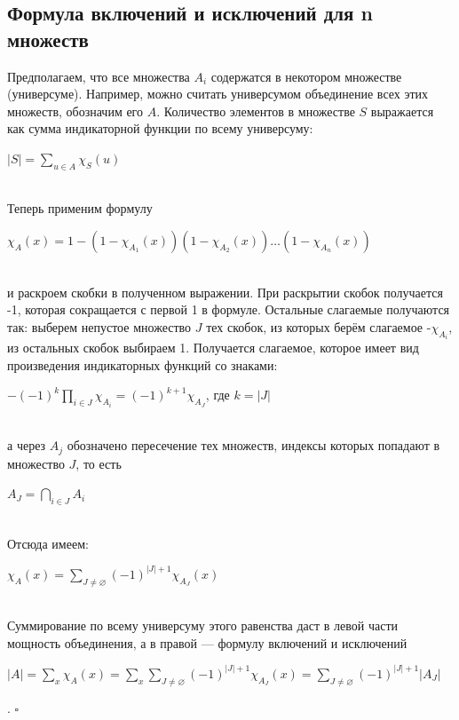 \documentclass[a4paper]{article}
\newcommand{\qed}{\hfill$\square$}
\begin{document}
\subsection{Формула включений и исключений для n множеств}
Предполагаем, что все множества $A_i$ содержатся в некотором множестве (универсуме). Например, можно считать универсумом объединение всех этих множеств, обозначим его $A$. Количество элементов в множестве $S$ выражается как сумма индикаторной функции по всему универсуму:\\[2mm]
\centerline{$|S|=\sum\limits_{u \in A} \chi_S(u)$}\\[2mm]
\indent Теперь применим формулу\\[2mm]
\centerline{$\chi_A(x)=1-\left(1-\chi_{A_1}(x)\right)\left(1-\chi_{A_2}(x)\right) \ldots\left(1-\chi_{A_n}(x)\right)$}\\[2mm]
и раскроем скобки в полученном выражении. При раскрытии скобок получается -1, которая сокращается с первой 1 в формуле. Остальные слагаемые получаются так: выберем непустое множество $J$ тех скобок, из которых берём слагаемое -$\chi_{A_i}$, из остальных скобок выбираем 1. Получается слагаемое, которое имеет вид произведения индикаторных функций со знаками:\\[2mm]
\centerline{$-(-1)^k \prod_{i \in J} \chi_{A_i}=(-1)^{k+1} \chi_{A_J}$, где $k=|J|$}\\[2mm]
а через $A_j$ обозначено пересечение тех множеств, индексы которых попадают в множество $J$, то есть\\[2mm]
\centerline{$A_J=\bigcap\limits_{i \in J} A_i$}\\[2mm]
Отсюда имеем:\\[2mm]
\centerline{$\chi_A(x)=\sum\limits_{J \neq \varnothing}(-1)^{|J|+1} \chi_{A_J}(x)$}\\[2mm]
\indent Суммирование по всему универсуму этого равенства даст в левой части мощность объединения, а в правой — формулу включений и исключений\\[2mm]
\centerline{$|A|=\sum\limits_{x} \chi_A(x)=\sum\limits_x \sum\limits_{J \neq \varnothing}(-1)^{|J|+1} \chi_{A_J}(x)=\sum\limits_{J \neq \varnothing}(-1)^{|J|+1}\left|A_J\right|$}. \qed
\end{document}
